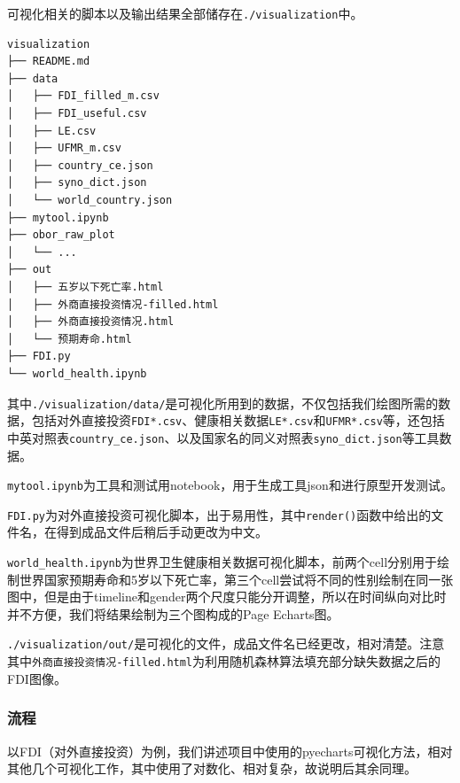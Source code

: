 \documentclass[]{ctexart}
\begin{document}
可视化相关的脚本以及输出结果全部储存在\texttt{./visualization}中。

\begin{verbatim}
visualization
├── README.md
├── data
│   ├── FDI_filled_m.csv
│   ├── FDI_useful.csv
│   ├── LE.csv
│   ├── UFMR_m.csv
│   ├── country_ce.json
│   ├── syno_dict.json
│   └── world_country.json
├── mytool.ipynb
├── obor_raw_plot
│   └── ...
├── out
│   ├── 五岁以下死亡率.html
│   ├── 外商直接投资情况-filled.html
│   ├── 外商直接投资情况.html
│   └── 预期寿命.html
├── FDI.py
└── world_health.ipynb
\end{verbatim}

其中\texttt{./visualization/data/}是可视化所用到的数据，不仅包括我们绘图所需的数据，包括对外直接投资\texttt{FDI*.csv}、健康相关数据\texttt{LE*.csv}和\texttt{UFMR*.csv}等，还包括中英对照表\texttt{country\_ce.json}、以及国家名的同义对照表\texttt{syno\_dict.json}等工具数据。

\texttt{mytool.ipynb}为工具和测试用notebook，用于生成工具json和进行原型开发测试。

\texttt{FDI.py}为对外直接投资可视化脚本，出于易用性，其中\texttt{render()}函数中给出的文件名，在得到成品文件后稍后手动更改为中文。

\texttt{world\_health.ipynb}为世界卫生健康相关数据可视化脚本，前两个cell分别用于绘制世界国家预期寿命和5岁以下死亡率，第三个cell尝试将不同的性别绘制在同一张图中，但是由于timeline和gender两个尺度只能分开调整，所以在时间纵向对比时并不方便，我们将结果绘制为三个图构成的Page
Echarts图。

\texttt{./visualization/out/}是可视化的文件，成品文件名已经更改，相对清楚。注意其中\texttt{外商直接投资情况-filled.html}为利用随机森林算法填充部分缺失数据之后的FDI图像。

\hypertarget{ux6d41ux7a0b}{%
\subsubsection{流程}\label{ux6d41ux7a0b}}

以FDI（对外直接投资）为例，我们讲述项目中使用的pyecharts可视化方法，相对其他几个可视化工作，其中使用了对数化、相对复杂，故说明后其余同理。
\end{document}
